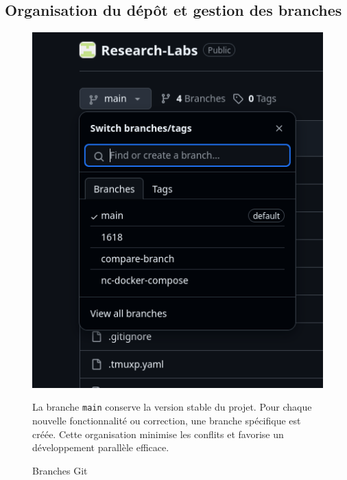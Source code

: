 \documentclass{rapportPfe}
\begin{document}
\subsection{Organisation du dépôt et gestion des branches}

\begin{figure}[H]
    \centering
    \begin{minipage}[t]{0.3\textwidth}
        \vspace{0pt} 
        \includegraphics[width=\textwidth]{diagrams/ss_04.png}
        \caption{Branches Git}
        \label{fig:diagram5}
    \end{minipage}
    \hfill
    \begin{minipage}[t]{0.65\textwidth}
        \vspace{80pt} 
        \noindent La branche \texttt{main} conserve la version stable du projet. Pour chaque nouvelle fonctionnalité ou correction, une branche spécifique est créée. Cette organisation minimise les conflits et favorise un développement parallèle efficace.
    \end{minipage}
\end{figure}
\end{document}
